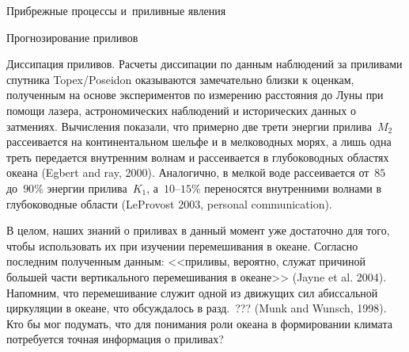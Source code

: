 \begin{chapter}{Прибрежные процессы и~приливные явления}
\begin{section}{Прогнозирование приливов}
\begin{paragraph}{Диссипация приливов.}
Расчеты диссипации по данным наблюдений за приливами спутника
Topex/Poseidon
оказываются замечательно близки к оценкам, полученным на основе
экспериментов по измерению расстояния до Луны при помощи лазера, 
астрономических наблюдений и исторических данных о затмениях.
Вычисления показали, что примерно две трети энергии прилива~$M_2$ 
рассеивается на континентальном шельфе и в мелководных морях, а лишь
одна треть передается внутренним волнам и рассеивается в глубоководных
областях океана (Egbert and ray, 2000). 
Аналогично, в мелкой воде рассеивается от~$85$ до~$90\%$ энергии прилива~$K_1$,
а~$10$--$15\%$ переносятся внутренними волнами в глубоководные 
области (LeProvost 2003, personal communication).
%

В целом, наших знаний о приливах в данный момент уже достаточно для того,
чтобы использовать их при изучении перемешивания
в океане. Согласно последним полученным данным: <<приливы, вероятно, служат
причиной большей части вертикального перемешивания в 
океане>> (Jayne et al. 2004). Напомним, что перемешивание служит одной из
движущих сил абиссальной циркуляции%
в океане, что обсуждалось в разд.~??? (Munk and Wunsch, 1998). 
Кто бы мог подумать, что для понимания роли океана в формировании климата
потребуется точная информация о приливах?
%
\end{paragraph}
\end{section}


\end{chapter}
